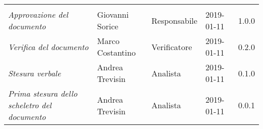 \newpage 
\section*{}
\begin{table}[H]
	\centering
	\begin{tabular}{p{4cm}|C{3cm}|C{3cm}|R{2.5cm}|R{2cm}}
		
		 & & & & \\
		
		
		\emph{Approvazione del documento} & Giovanni Sorice & Responsabile & 2019-01-11 & 1.0.0 \\
		\hline
		
		\emph{Verifica del documento} & Marco Costantino & Verificatore & 2019-01-11 & 0.2.0 \\
		\hline

		\emph{Stesura verbale} & Andrea Trevisin & Analista & 2019-01-11 & 0.1.0 \\
		\hline
		
		\emph{Prima stesura dello scheletro del documento} & Andrea Trevisin & Analista & 2019-01-11 & 0.0.1 \\
		
	\end{tabular}
	
\end{table}


\clearpage